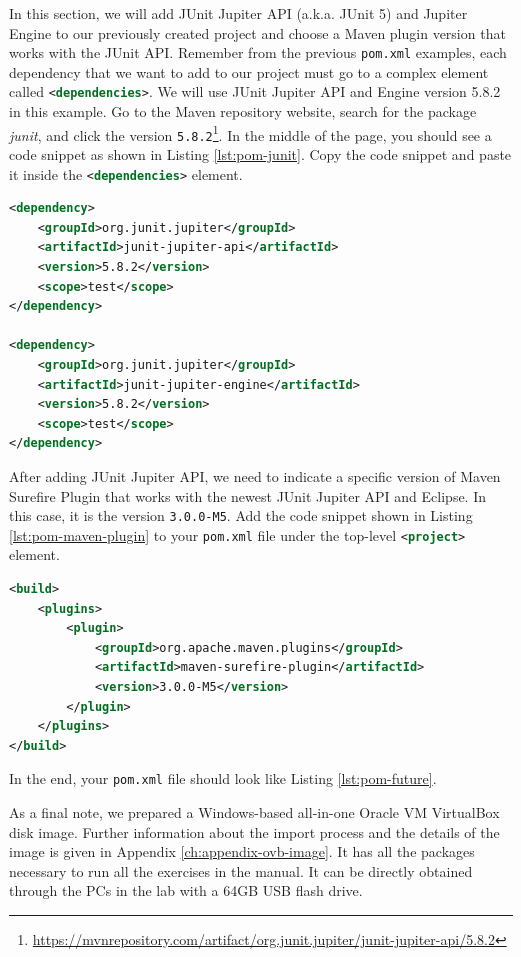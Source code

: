 In this section, we will add JUnit Jupiter API (a.k.a. JUnit 5) and Jupiter Engine to our previously created project and choose a Maven plugin version that works with the JUnit API. Remember from the previous \lstinline[language={}]|pom.xml| examples, each dependency that we want to add to our project must go to a complex element called \lstinline[language=XML]|<dependencies>|. We will use JUnit Jupiter API and Engine version 5.8.2 in this example. Go to the Maven repository website, search for the package \emph{junit}, and click the version \lstinline[language={}]|5.8.2|\footnote{\url{https://mvnrepository.com/artifact/org.junit.jupiter/junit-jupiter-api/5.8.2}}. In the middle of the page, you should see a code snippet as shown in Listing \ref{lst:pom-junit}. Copy the code snippet and paste it inside the \lstinline[language=XML]|<dependencies>| element.

\begin{lstlisting}[language=XML,caption={JUnit Jupiter API and Engine version 5.8.2 dependency elements.},label=lst:pom-junit]
<dependency>
    <groupId>org.junit.jupiter</groupId>
    <artifactId>junit-jupiter-api</artifactId>
    <version>5.8.2</version>
    <scope>test</scope>
</dependency>

<dependency>
    <groupId>org.junit.jupiter</groupId>
    <artifactId>junit-jupiter-engine</artifactId>
    <version>5.8.2</version>
    <scope>test</scope>
</dependency>
\end{lstlisting}

After adding JUnit Jupiter API, we need to indicate a specific version of Maven Surefire Plugin that works with the newest JUnit Jupiter API and Eclipse. In this case, it is the version \lstinline[language={}]|3.0.0-M5|. Add the code snippet shown in Listing \ref{lst:pom-maven-plugin} to your \lstinline[language={}]|pom.xml| file under the top-level \lstinline[language=XML]|<project>| element.

\begin{lstlisting}[language=XML,caption={A compatible Maven Surefire Plugin with Eclipse and JUnit Jupiter API v5.8.2..},label=lst:pom-maven-plugin]
<build>
    <plugins>
        <plugin>
            <groupId>org.apache.maven.plugins</groupId>
            <artifactId>maven-surefire-plugin</artifactId>
            <version>3.0.0-M5</version>
        </plugin>
    </plugins>
</build>
\end{lstlisting}

In the end, your \lstinline[language={}]|pom.xml| file should look like Listing \ref{lst:pom-future}.



As a final note, we prepared a Windows-based all-in-one Oracle VM VirtualBox disk image. Further information about the import process and the details of the image is given in Appendix \ref{ch:appendix-ovb-image}. It has all the packages necessary to run all the exercises in the manual. It can be directly obtained through the PCs in the lab with a 64GB USB flash drive.